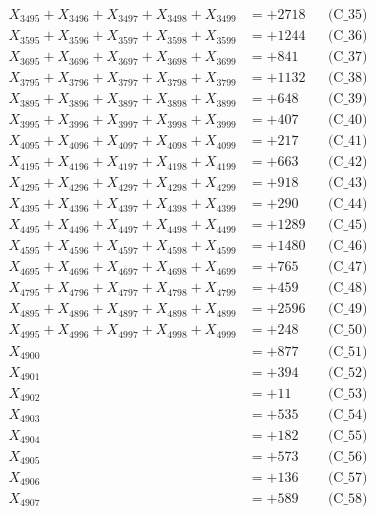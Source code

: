 \documentclass[a4paper,10pt]{article}
\begin{document}
{\begin{align}
X_{3495} + X_{3496} + X_{3497} + X_{3498} + X_{3499} &= +2718 && \text{(C\_35)} \\
\allowbreak
X_{3595} + X_{3596} + X_{3597} + X_{3598} + X_{3599} &= +1244 && \text{(C\_36)} \\
X_{3695} + X_{3696} + X_{3697} + X_{3698} + X_{3699} &= +841 && \text{(C\_37)} \\
X_{3795} + X_{3796} + X_{3797} + X_{3798} + X_{3799} &= +1132 && \text{(C\_38)} \\
X_{3895} + X_{3896} + X_{3897} + X_{3898} + X_{3899} &= +648 && \text{(C\_39)} \\
X_{3995} + X_{3996} + X_{3997} + X_{3998} + X_{3999} &= +407 && \text{(C\_40)} \\
\allowbreak
X_{4095} + X_{4096} + X_{4097} + X_{4098} + X_{4099} &= +217 && \text{(C\_41)} \\
X_{4195} + X_{4196} + X_{4197} + X_{4198} + X_{4199} &= +663 && \text{(C\_42)} \\
X_{4295} + X_{4296} + X_{4297} + X_{4298} + X_{4299} &= +918 && \text{(C\_43)} \\
X_{4395} + X_{4396} + X_{4397} + X_{4398} + X_{4399} &= +290 && \text{(C\_44)} \\
X_{4495} + X_{4496} + X_{4497} + X_{4498} + X_{4499} &= +1289 && \text{(C\_45)} \\
\allowbreak
X_{4595} + X_{4596} + X_{4597} + X_{4598} + X_{4599} &= +1480 && \text{(C\_46)} \\
X_{4695} + X_{4696} + X_{4697} + X_{4698} + X_{4699} &= +765 && \text{(C\_47)} \\
X_{4795} + X_{4796} + X_{4797} + X_{4798} + X_{4799} &= +459 && \text{(C\_48)} \\
X_{4895} + X_{4896} + X_{4897} + X_{4898} + X_{4899} &= +2596 && \text{(C\_49)} \\
X_{4995} + X_{4996} + X_{4997} + X_{4998} + X_{4999} &= +248 && \text{(C\_50)} \\
\allowbreak
X_{4900} &= +877 && \text{(C\_51)} \\
X_{4901} &= +394 && \text{(C\_52)} \\
X_{4902} &= +11 && \text{(C\_53)} \\
X_{4903} &= +535 && \text{(C\_54)} \\
X_{4904} &= +182 && \text{(C\_55)} \\
\allowbreak
X_{4905} &= +573 && \text{(C\_56)} \\
X_{4906} &= +136 && \text{(C\_57)} \\
X_{4907} &= +589 && \text{(C\_58)} \\

\end{align}}
\end{document}
